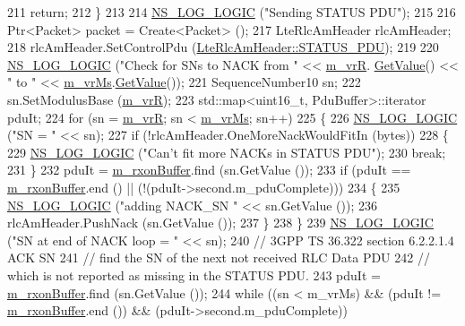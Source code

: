 \begin{DoxyCode}
211           \textcolor{keywordflow}{return};
212         \}
213 
214       \hyperlink{group__logging_ga88acd260151caf2db9c0fc84997f45ce}{NS\_LOG\_LOGIC} (\textcolor{stringliteral}{"Sending STATUS PDU"});
215 
216       Ptr<Packet> packet = Create<Packet> ();
217       LteRlcAmHeader rlcAmHeader;
218       rlcAmHeader.SetControlPdu (\hyperlink{classns3_1_1LteRlcAmHeader_a91ebd7f63ef09e33d7755c660add464ea2d662e6a06cefca8c790c83cc2f5ed95}{LteRlcAmHeader::STATUS\_PDU});
219      
220       \hyperlink{group__logging_ga88acd260151caf2db9c0fc84997f45ce}{NS\_LOG\_LOGIC} (\textcolor{stringliteral}{"Check for SNs to NACK from "} << \hyperlink{classns3_1_1LteRlcAm_aeec4bcfab747723421c68ed38feea081}{m\_vrR}.
      \hyperlink{classns3_1_1SequenceNumber10_a9dcaea04bc415e169e7e0020ce579d01}{GetValue}() << \textcolor{stringliteral}{" to "} << \hyperlink{classns3_1_1LteRlcAm_a474fc32f3d26bb6762782e8fd7e01c60}{m\_vrMs}.\hyperlink{classns3_1_1SequenceNumber10_a9dcaea04bc415e169e7e0020ce579d01}{GetValue}());
221       SequenceNumber10 sn;
222       sn.SetModulusBase (\hyperlink{classns3_1_1LteRlcAm_aeec4bcfab747723421c68ed38feea081}{m\_vrR});
223       std::map<uint16\_t, PduBuffer>::iterator pduIt;
224       \textcolor{keywordflow}{for} (sn = \hyperlink{classns3_1_1LteRlcAm_aeec4bcfab747723421c68ed38feea081}{m\_vrR}; sn < \hyperlink{classns3_1_1LteRlcAm_a474fc32f3d26bb6762782e8fd7e01c60}{m\_vrMs}; sn++) 
225         \{
226           \hyperlink{group__logging_ga88acd260151caf2db9c0fc84997f45ce}{NS\_LOG\_LOGIC} (\textcolor{stringliteral}{"SN = "} << sn);          
227           \textcolor{keywordflow}{if} (!rlcAmHeader.OneMoreNackWouldFitIn (bytes))
228             \{
229               \hyperlink{group__logging_ga88acd260151caf2db9c0fc84997f45ce}{NS\_LOG\_LOGIC} (\textcolor{stringliteral}{"Can't fit more NACKs in STATUS PDU"});
230               \textcolor{keywordflow}{break};
231             \}          
232           pduIt = \hyperlink{classns3_1_1LteRlcAm_a7442b4f97fccd0c393dd9f27325a853a}{m\_rxonBuffer}.find (sn.GetValue ());
233           \textcolor{keywordflow}{if} (pduIt == \hyperlink{classns3_1_1LteRlcAm_a7442b4f97fccd0c393dd9f27325a853a}{m\_rxonBuffer}.end () || (!(pduIt->second.m\_pduComplete)))
234             \{
235               \hyperlink{group__logging_ga88acd260151caf2db9c0fc84997f45ce}{NS\_LOG\_LOGIC} (\textcolor{stringliteral}{"adding NACK\_SN "} << sn.GetValue ());
236               rlcAmHeader.PushNack (sn.GetValue ());              
237             \}          
238         \}
239       \hyperlink{group__logging_ga88acd260151caf2db9c0fc84997f45ce}{NS\_LOG\_LOGIC} (\textcolor{stringliteral}{"SN at end of NACK loop = "} << sn);
240       \textcolor{comment}{// 3GPP TS 36.322 section 6.2.2.1.4 ACK SN}
241       \textcolor{comment}{// find the  SN of the next not received RLC Data PDU }
242       \textcolor{comment}{// which is not reported as missing in the STATUS PDU. }
243       pduIt = \hyperlink{classns3_1_1LteRlcAm_a7442b4f97fccd0c393dd9f27325a853a}{m\_rxonBuffer}.find (sn.GetValue ());
244       \textcolor{keywordflow}{while} ((sn < m\_vrMs) && (pduIt != \hyperlink{classns3_1_1LteRlcAm_a7442b4f97fccd0c393dd9f27325a853a}{m\_rxonBuffer}.end ()) && (pduIt->second.m\_pduComplete)) 
                 

\end{DoxyCode}
